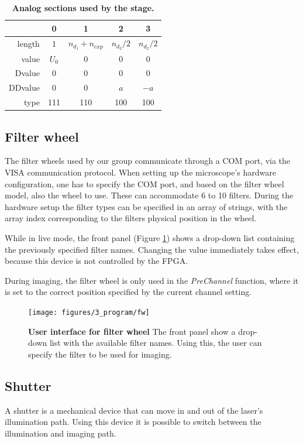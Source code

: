 \documentclass{tdk_style}
\begin{document}
\begin{table}[htbp]
\centering
\begin{tabular}{r|c||c|c|c}
			& 0 & 1 & 2 & 3\\ \hline \hline
	length  & 1 & $n_{d_1} + n_{exp}$ & $n_{d_2}/2$ & $n_{d_2}/2$ \\
	value   & $U_{0}$ & 0 & 0 & 0  \\
	Dvalue  & 0 & 0 & 0 & 0 \\
	DDvalue & 0 & 0 & $a$ & $-a$ \\
	type    & 111& 110 & 100 & 100 \\
\end{tabular}
\caption{\textbf{Analog sections used by the stage.}}
\label{tab:stage}
\end{table}



\subsection{Filter wheel}
The filter wheels used by our group communicate through a COM port, via the VISA communication protocol. When setting up the microscope's hardware configuration, one has to specify the COM port, and based on the filter wheel model, also the wheel to use. These can accommodate 6 to 10 filters. During the hardware setup the filter types can be specified in an array of strings, with the array index corresponding to the filters physical position in the wheel.

While in live mode, the front panel (Figure \ref{fig:ui_fw}) shows a drop-down list containing the previously specified filter names. Changing the value immediately takes effect, because this device is not controlled by the FPGA.

During imaging, the filter wheel is only used in the \emph{PreChannel} function, where it is set to the correct position specified by the current channel setting.

\begin{figure}[htbp]
	\centering
	\texttt{[image: figures/3\_program/fw]}
	\caption{\textbf{User interface for filter wheel} The front panel show a drop-down list with the available filter names. Using this, the user can specify the filter to be used for imaging.}
	\label{fig:ui_fw}
\end{figure}



\subsection{Shutter}
A shutter is a mechanical device that can move in and out of the laser's illumination path. Using this device it is possible to switch between the illumination and imaging path.
\end{document}
